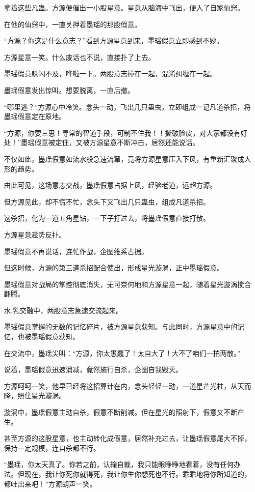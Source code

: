 \begin{this_body}
拿着这些凡蛊。方源便催出一小股星意。星意从脑海中飞出，便入了自家仙窍。

在他的仙窍中，一直关押着墨瑶的那股假意。

“方源？你这是什么意志？”看到方源星意到来，墨瑶假意立即感到不妙。

方源星意一笑。什么废话也不说，直接扑了上去。

墨瑶假意躲闪不及，哗啦一下。两股意志撞在一起，混淆纠缠在一起。

墨瑶假意发出惊叫。想要脱离，一直后撤。

“哪里逃？”方源心中冷笑。念头一动，飞出几只蛊虫，立即组成一记凡道杀招，将墨瑶假意定在原地。

“方源，你要三思！寻常的智道手段，可制不住我！！撕破脸皮，对大家都没有好处！”墨瑶假意被定住，又被方源星意不断冲击，居然还能说话。

不仅如此，墨瑶假意如流水般急速流窜，竟将方源星意压入下风，有重新汇聚成人形的趋势。

由此可见，这场意志交战，墨瑶假意占据上风，经验老道，远超方源。

但方源见此，却不慌不忙，念头下又飞出几只蛊虫，组成凡道杀招。

这杀招，化为一道五角星钻，一下子打过去，将墨瑶假意直接打散。

方源星意趁势反扑。

墨瑶假意不再说话，连忙作战，企图维系占据。

但这时候，方源的第三道杀招配合使出，形成星光漩涡，正中墨瑶假意。

墨瑶假意对战局的掌控彻底消失，无可奈何地和方源星意一起，随着星光漩涡搅合翻腾。

水.乳交融中，两股意志急速交流起来。

墨瑶假意掌握的无数的记忆碎片，被方源星意获知。与此同时，方源星意中的记忆，也被墨瑶假意获知。

在交流中，墨瑶尖叫：“方源，你太愚蠢了！太自大了！大不了咱们一拍两散。”

说着，墨瑶假意迅速消减，竟然施行自杀，企图自我毁灭。

方源呵呵一笑，他早已经将这招算计在内，念头轻轻一动，一道星芒光柱，从天而降，照住星光漩涡。

漩涡中，墨瑶假意主动自杀，假意不断削减。但在星光的照射下，假意又不断产生。

甚至方源的这股星意，也主动转化成假意，居然补充过去，让墨瑶假意尾大不掉，保持一定规模，连自杀都不行。

“墨瑶，你太天真了。你若之前，认输自裁，我只能眼睁睁地看着，没有任何办法。但现在，我让你死你就得死，我让你生你想死也不行。乖乖地将你所知道的，都吐出来吧！”方源朗声一笑。


\end{this_body}
